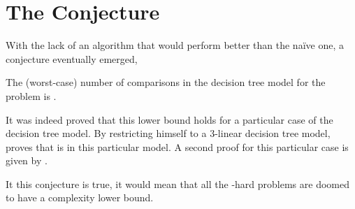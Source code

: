 \section{The Conjecture}

With the lack of an algorithm that would perform better than the naïve
 one, a conjecture eventually emerged,

\begin{conjecture}
The (worst-case) number of comparisons in the decision tree model for the
\threeSUM problem is .
\end{conjecture}

It was indeed proved that this lower bound holds for a particular case of the
decision tree model. By restricting himself to a $3$-linear decision tree
model, \citet{erickson:1999} proves that \threeSUM is  in this
particular model. A second proof for this particular case is given by
\citet{ailon:2005}.

It this conjecture is true, it would mean that all the \threeSUM-hard
problems are doomed to have a  complexity lower bound.
